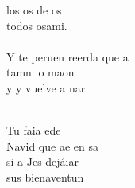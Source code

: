 \begin{cancion}
	los os de os \\
	todos osami.  \\
\jump\\
	Y te peruen reerda que a \\
	tamn lo maon \\
	y y vuelve a nar\\\jump\\
	\begin{chorus}%
	Tu faia ede  \\
	Navid que ae en sa\\
	si a Jes dejáiar\\
	 sus bienaventun   \\
	\end{chorus}%
	\jump\\
\end{cancion}%

